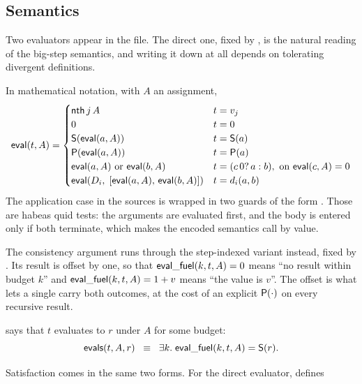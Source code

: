 \subsection{Semantics}
\label{sec:fuel}

Two evaluators appear in the file.  The direct one, fixed by
, is the natural reading of the \BGA{} big-step semantics,
and writing it down at all depends on \QGA{} tolerating divergent definitions.


\noindent
In mathematical notation, with $A$ an assignment,
\[
\mathsf{eval}(t, A) =
\begin{cases}
\mathsf{nth}\,j\,A                     & t = v_j\\
0                                  & t = 0\\
\mathsf{S}(\mathsf{eval}(a, A))              & t = \mathsf{S}(a)\\
\mathsf{P}(\mathsf{eval}(a, A))              & t = \mathsf{P}(a)\\
\mathsf{eval}(a, A) \text{ or } \mathsf{eval}(b, A)
                                   & t = (c\,0?\,a:b), \text{ on } \mathsf{eval}(c, A) = 0\\
\mathsf{eval}(D_i,\; [\mathsf{eval}(a, A),\, \mathsf{eval}(b, A)])
                                   & t = d_i(a, b)
\end{cases}
\]
The application case in the sources is wrapped in two guards of the form
.  Those are habeas quid tests: the arguments are
evaluated first, and the body is entered only if both terminate, which makes
the encoded semantics call by value.

The consistency argument runs through the step-indexed variant instead, fixed
by .  Its result is offset by one, so that
$\mathsf{eval\_fuel}(k, t, A) = 0$ means ``no result within budget $k$'' and
$\mathsf{eval\_fuel}(k, t, A) = 1 + v$ means ``the value is $v$''.  The offset is
what lets a single  carry both outcomes, at the cost of an explicit
$\mathsf{P}(\cdot)$ on every recursive result.


\noindent
{} says that $t$ evaluates to $r$ under $A$ for some budget:
\[
\mathsf{evals}(t, A, r) \;\;\equiv\;\; \exists k.\; \mathsf{eval\_fuel}(k, t, A) = \mathsf{S}(r).
\]

Satisfaction comes in the same two forms.  For the direct evaluator,
 defines


